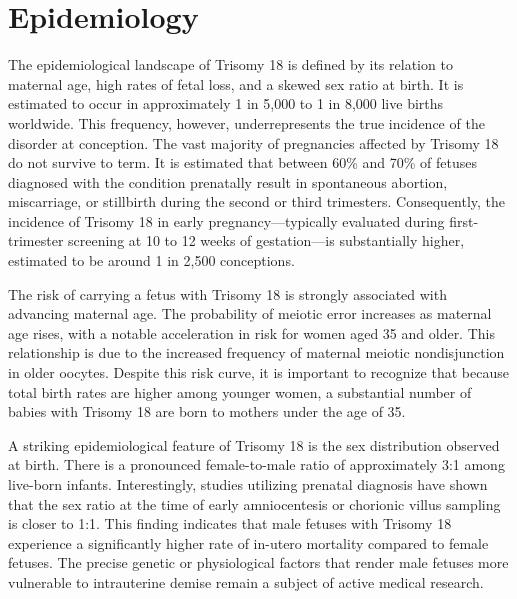 \section*{Epidemiology}
The epidemiological landscape of Trisomy 18 is defined by its relation to maternal age, high rates of fetal loss, and a skewed sex ratio at birth. It is estimated to occur in approximately 1 in 5,000 to 1 in 8,000 live births worldwide. This frequency, however, underrepresents the true incidence of the disorder at conception. The vast majority of pregnancies affected by Trisomy 18 do not survive to term. It is estimated that between 60\% and 70\% of fetuses diagnosed with the condition prenatally result in spontaneous abortion, miscarriage, or stillbirth during the second or third trimesters. Consequently, the incidence of Trisomy 18 in early pregnancy—typically evaluated during first-trimester screening at 10 to 12 weeks of gestation—is substantially higher, estimated to be around 1 in 2,500 conceptions.

The risk of carrying a fetus with Trisomy 18 is strongly associated with advancing maternal age. The probability of meiotic error increases as maternal age rises, with a notable acceleration in risk for women aged 35 and older. This relationship is due to the increased frequency of maternal meiotic nondisjunction in older oocytes. Despite this risk curve, it is important to recognize that because total birth rates are higher among younger women, a substantial number of babies with Trisomy 18 are born to mothers under the age of 35.

A striking epidemiological feature of Trisomy 18 is the sex distribution observed at birth. There is a pronounced female-to-male ratio of approximately 3:1 among live-born infants. Interestingly, studies utilizing prenatal diagnosis have shown that the sex ratio at the time of early amniocentesis or chorionic villus sampling is closer to 1:1. This finding indicates that male fetuses with Trisomy 18 experience a significantly higher rate of in-utero mortality compared to female fetuses. The precise genetic or physiological factors that render male fetuses more vulnerable to intrauterine demise remain a subject of active medical research.

